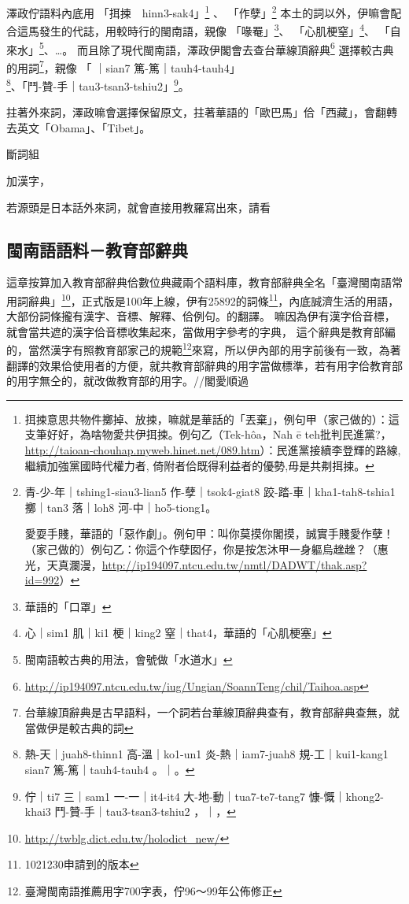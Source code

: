 澤政佇語料內底用
「挕捒　hinn3-sak4」\footnote{挕捒意思共物件擲掉、放捒，嘛就是華話的「丟棄」，例句甲（家己做的）：這支筆好好，為啥物愛共伊挕捒。例句乙（Tek-hôa，Nah ē teh批判民進黨?，\url{http://taioan-chouhap.myweb.hinet.net/089.htm}）：民進黨接續李登輝的路線, 繼續加強黨國時代權力者, 倚附者佮既得利益者的優勢,毋是共刜挕捒。}
、
「作孽」\footnote{
青-少-年｜tshing1-siau3-lian5 作-孽｜tsok4-giat8 跤-踏-車｜kha1-tah8-tshia1 擲｜tan3 落｜loh8 河-中｜ho5-tiong1。

愛耍手賤，華語的「惡作劇」。例句甲：叫你莫摸你閣摸，誠實手賤愛作孽！（家己做的）例句乙：你這个作孽囡仔，你是按怎沐甲一身軀烏趖趖？（惠光，天真瀾漫，\url{http://ip194097.ntcu.edu.tw/nmtl/DADWT/thak.asp?id=992}）}
本土的詞以外，伊嘛會配合這馬發生的代誌，用較時行的閩南語，親像
「喙罨」\footnote{華語的「口罩」}、
「心肌梗窒」\footnote{心｜sim1 肌｜ki1 梗｜king2 窒｜that4，華語的「心肌梗塞」}、
「自來水」\footnote{閩南語較古典的用法，會號做「水道水」}、…。
而且除了現代閩南語，澤政伊閣會去查台華線頂辭典\footnote{\url{http://ip194097.ntcu.edu.tw/iug/Ungian/SoannTeng/chil/Taihoa.asp}}
選擇較古典的用詞\footnote{台華線頂辭典是古早語料，一个詞若台華線頂辭典查有，教育部辭典查無，就當做伊是較古典的詞}，親像
「𤺪｜sian7 篤-篤｜tauh4-tauh4」\footnote{熱-天｜juah8-thinn1 高-溫｜ko1-un1 炎-熱｜iam7-juah8 規-工｜kui1-kang1 𤺪｜sian7 篤-篤｜tauh4-tauh4 。｜。}、「鬥-贊-手｜tau3-tsan3-tshiu2」\footnote{佇｜ti7 三｜sam1 一-一｜it4-it4 大-地-動｜tua7-te7-tang7 慷-慨｜khong2-khai3 鬥-贊-手｜tau3-tsan3-tshiu2 ，｜，}。

拄著外來詞，澤政嘛會選擇保留原文，拄著華語的「歐巴馬」佮「西藏」，會翻轉去英文「Obama」、「Tibet」。

斷詞組

加漢字，

若源頭是日本話外來詞，就會直接用教羅寫出來，請看

\subsection{閩南語語料－教育部辭典}
\label{節：教育部辭典}
這章按算加入教育部辭典佮數位典藏兩个語料庫，教育部辭典全名「臺灣閩南語常用詞辭典」\footnote{\url{http://twblg.dict.edu.tw/holodict_new/}}，正式版是100年上線，伊有25892的詞條\footnote{1021230申請到的版本}，內底誠濟生活的用語，大部份詞條攏有漢字、音標、解釋、佮例句。的翻譯。
嘛因為伊有漢字佮音標，就會當共遮的漢字佮音標收集起來，當做用字參考的字典，
這个辭典是教育部編的，當然漢字有照教育部家己的規範\footnote{臺灣閩南語推薦用字700字表，佇96～99年公佈修正}來寫，所以伊內部的用字前後有一致，為著翻譯的效果佮使用者的方便，就共教育部辭典的用字當做標準，若有用字佮教育部的用字無仝的，就改做教育部的用字。//閣愛順過

